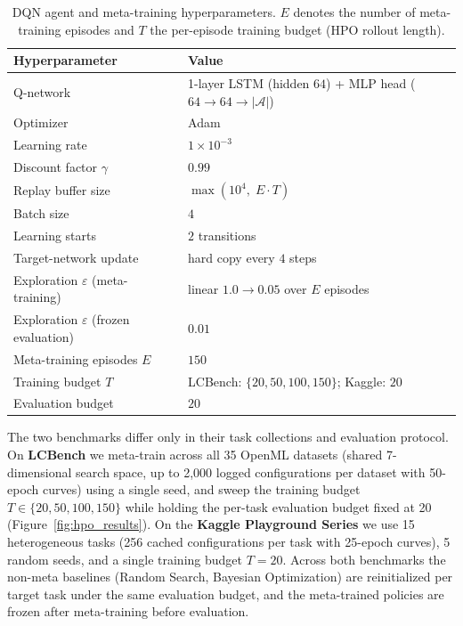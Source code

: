\begin{table}[htbp]
\centering
\caption{DQN agent and meta-training hyperparameters. $E$ denotes the number of meta-training episodes and $T$ the per-episode training budget (HPO rollout length).}
\label{tab:dqn_hparams}
\begin{tabular}{ll}
\toprule
Hyperparameter & Value \\
\midrule
Q-network & 1-layer LSTM (hidden $64$) + MLP head ($64\!\rightarrow\!64\!\rightarrow\!|\mathcal{A}|$) \\
Optimizer & Adam \\
Learning rate & $1 \times 10^{-3}$ \\
Discount factor $\gamma$ & $0.99$ \\
Replay buffer size & $\max(10^4,\; E \cdot T)$ \\
Batch size & $4$ \\
Learning starts & $2$ transitions \\
Target-network update & hard copy every $4$ steps \\
Exploration $\varepsilon$ (meta-training) & linear $1.0 \rightarrow 0.05$ over $E$ episodes \\
Exploration $\varepsilon$ (frozen evaluation) & $0.01$ \\
Meta-training episodes $E$ & $150$ \\
Training budget $T$ & LCBench: $\{20, 50, 100, 150\}$; \quad Kaggle: $20$ \\
Evaluation budget & $20$ \\
\bottomrule
\end{tabular}
\end{table}

The two benchmarks differ only in their task collections and evaluation protocol. On \textbf{LCBench} we meta-train across all 35 OpenML datasets (shared 7-dimensional search space, up to 2{,}000 logged configurations per dataset with 50-epoch curves) using a single seed, and sweep the training budget $T \in \{20, 50, 100, 150\}$ while holding the per-task evaluation budget fixed at 20 (Figure~\ref{fig:hpo_results}). On the \textbf{Kaggle Playground Series} we use 15 heterogeneous tasks (256 cached configurations per task with 25-epoch curves), 5 random seeds, and a single training budget $T = 20$. Across both benchmarks the non-meta baselines (Random Search, Bayesian Optimization) are reinitialized per target task under the same evaluation budget, and the meta-trained policies are frozen after meta-training before evaluation.

